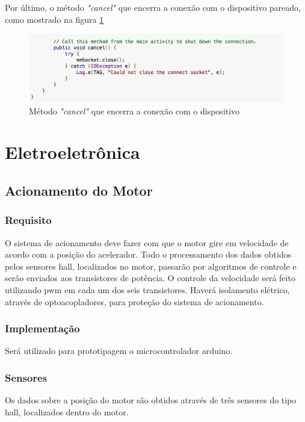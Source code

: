 Por último, o método \textit{"cancel"} que encerra a conexão com o dispositivo pareado, como mostrado na figura \ref{img:trecho5}

\graphicspath{{figuras/}}
  \begin{figure}[h!]
  \centering
  \includegraphics[scale=0.80]{cancel_method}
  \caption{Método \textit{"cancel"} que encerra a conexão com o dispositivo}
  \label{img:trecho5}
  \end{figure}  
  
  \section{Eletroeletrônica}
	
	  	\subsection{Acionamento do Motor}
		\subsubsection{Requisito}
	O sistema de acionamento deve fazer com que o motor gire em velocidade de acordo com a posição do acelerador. Todo o processamento dos dados obtidos pelos sensores hall, localizados no motor, passarão por algoritmos de controle e serão enviados aos transístores de potência. O controle da velocidade será feito utilizando pwm em cada um dos seis transistores. Haverá isolamento elétrico, através de optoacopladores, para proteção do sistema de acionamento.
	\subsubsection{Implementação}
	Será utilizado para prototipagem o microcontrolador arduino.
  
	\subsubsection{Sensores}
	  Os dados sobre a posição do motor são obtidos através de três sensores do tipo hall, localizados dentro do motor.
	
